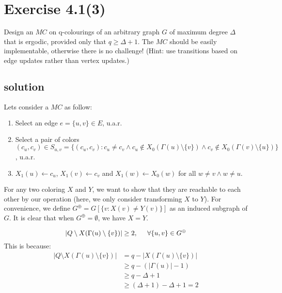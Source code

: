 \documentclass{article}
\begin{document}
\section{Exercise 4.1(3)}
Design an $MC$ on q-colourings of an arbitrary graph $G$ of maximum degree $\Delta$ that is ergodic, provided only that $q \geq \Delta + 1$. The $MC$ should be easily implementable, otherwise there is no challenge! (Hint: use transitions based on edge updates rather than vertex updates.)
\subsection{solution}
Lets consider a $MC$ as follow:
\begin{tcolorbox}[title = The $MC$ Designed by Me]
  \begin{enumerate}[itemsep=0mm]
  \item Select an edge $e = \{u, v\}\in E$, u.a.r.
  \item Select a pair of colors $(c_u, c_v) \in S_{u,v} = \{(c_u, c_v): c_u\not=c_v \land c_u\not\in X_0(\Gamma(u)\setminus\{v\}) \land c_v\not\in X_0(\Gamma(v)\setminus\{u\})\}$, u.a.r.
  \item $X_1(u)\gets c_u$, $X_1(v)\gets c_v$ and $X_1(w) \gets X_0(w)$ for all $w\not=v\land w\not=u$.
  \end{enumerate}
\end{tcolorbox}
For any two coloring $X$ and $Y$, we want to show that they are reachable to each other by our operation (here, we only consider transforming $X$ to $Y$). For convenience, we define $G^{\oplus} = G[\{v: X(v)\not=Y(v)\}]$ as an induced subgraph of $G$. It is clear that when $G^\oplus = \emptyset$, we have $X = Y$.

\begin{tcolorbox}[title = An Interesting Observation(1)]
  \[
    |Q\setminus X(\Gamma(u)\setminus\{v\})| \geq 2, \hspace{0.5cm} \forall \{u, v\} \in G^\oplus
  \]
  \tcblower
  This is because:
  \begin{align*}
    |Q\setminus X(\Gamma(u)\setminus\{v\})| &= q - |X(\Gamma(u)\setminus\{v\})| \\
    &\geq q - (|\Gamma(u)| - 1) \\
    &\geq q - \Delta + 1 \\
    &\geq (\Delta+1) - \Delta + 1 = 2
  \end{align*}
\end{tcolorbox}
\end{document}
